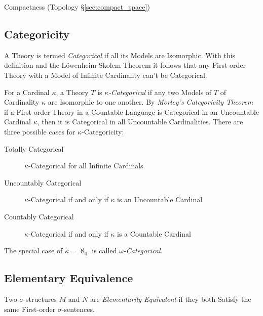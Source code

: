 Compactness (Topology \S\ref{sec:compact_space})



\subsection{Categoricity}\label{sec:categoricity}

A Theory is termed \emph{Categorical} if all its Models are
Isomorphic. With this definition and the L\"owenheim-Skolem Theorem it
follows that any First-order Theory with a Model of Infinite
Cardinality can't be Categorical.

For a Cardinal $\kappa$, a Theory $T$ is \emph{$\kappa$-Categorical}
if any two Models of $T$ of Cardinality $\kappa$ are Isomorphic to one
another. By \emph{Morley's Categoricity Theorem}\cite{morley65} if a
First-order Theory in a Countable Language is Categorical in an
Uncountable Cardinal $\kappa$, then it is Categorical in all
Uncountable Cardinalities. There are three possible cases for
$\kappa$-Categoricity:
\begin{description}
\item[Totally Categorical] $\kappa$-Categorical for all Infinite
  Cardinals
\item[Uncountably Categorical] $\kappa$-Categorical if and only if
  $\kappa$ is an Uncountable Cardinal
\item[Countably Categorical] $\kappa$-Categorical if and only if
  $\kappa$ is a Countable Cardinal
\end{description}
The special case of $\kappa = \aleph_0$ is called
\emph{$\omega$-Categorical}.



\subsection{Elementary Equivalence}\label{sec:elementary_equivalence}

Two $\sigma$-structures $M$ and $N$ are \emph{Elementarily Equivalent}
if they both Satisfy the same First-order $\sigma$-sentences.



